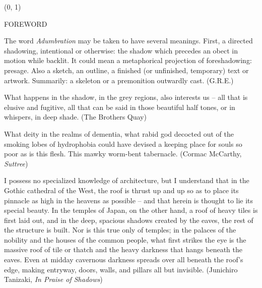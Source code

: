 \documentclass[11pt]{article}
\begin{document}
\begin{textblock}{23}(0, 1)
\begin{center}
\huge FOREWORD
\end{center}
\end{textblock}

\vspace*{0.15\baselineskip}

\begingroup
\begin{center}
The word \textit{Adumbration} may be taken to have several meanings. First, a directed shadowing, intentional or otherwise: the shadow which precedes an obect in motion while backlit. It could mean a metaphorical projection of foreshadowing: presage. Also a sketch, an outline, a finished (or unfinished, temporary) text or artwork. Summarily: a skeleton or a premonition outwardly cast.
\rightskip\leftskip
\phantom{text} \hfill (G.R.E.)
\end{center}
\endgroup

\begingroup
\begin{center}
What happens in the shadow, in the grey regions, also interests us -- all that is elusive and fugitive, all that can be said in those beautiful half tones, or in whispers, in deep shade.
\rightskip\leftskip
\phantom{text} \hfill (The Brothers Quay)
\end{center}
\endgroup

\begingroup
\begin{center}
What deity in the realms of dementia, what rabid god decocted out of the smoking lobes of hydrophobia could have devised a keeping place for souls so poor as is this flesh. This mawky worm-bent tabernacle.
\rightskip\leftskip
\phantom{text} \hfill (Cormac McCarthy, \textit{Suttree})
\end{center}
\endgroup

\begingroup
\begin{center}
I possess no specialized knowledge of architecture, but I understand that in the Gothic cathedral
of the West, the roof is thrust up and up so as to place its pinnacle as high in the heavens as
possible -- and that herein is thought to lie its special beauty. In the temples of Japan, on the other
hand, a roof of heavy tiles is first laid out, and in the deep, spacious shadows created by the eaves,
the rest of the structure is built. Nor is this true only of temples; in the palaces of the nobility and
the houses of the common people, what first strikes the eye is the massive roof of tile or thatch
and the heavy darkness that hangs beneath the eaves. Even at midday cavernous darkness spreads
over all beneath the roof's edge, making entryway, doors, walls, and pillars all but invisible. 
\rightskip\leftskip
\phantom{text} \hfill (Junichiro Tanizaki, \textit{In Praise of Shadows})
\end{center}
\endgroup
\end{document}
